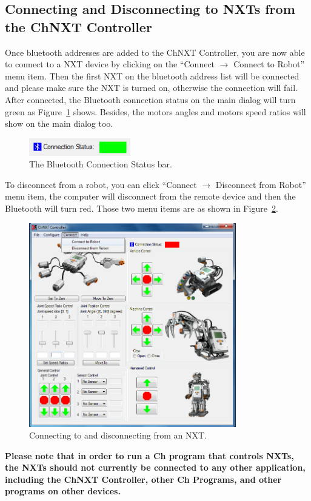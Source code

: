\documentclass[11pt]{article}
\begin{document}
\subsection{Connecting and Disconnecting to NXTs from the ChNXT Controller}
Once bluetooth addresses are added to the ChNXT Controller, you are now able to 
connect to a NXT device by clicking on the ``Connect $\rightarrow$ Connect to Robot'' 
menu item. Then the first NXT on the bluetooth address list will be connected 
and please make sure the NXT is turned on, otherwise the connection will fail. 
After connected, the Bluetooth connection status on the main dialog will turn
green as Figure~\ref{fig:bt_connection_status} shows. Besides, the motors angles
and motors speed ratios will show on the main dialog too.
\begin{figure}[H]
  \begin{center}
    \includegraphics[height=0.3in]{figure/configuration/btConnectionStatus.png}
    \caption{The Bluetooth Connection Status bar.\label{fig:bt_connection_status}}
  \end{center}
\end{figure}
To disconnect from a robot, you can click ``Connect $\rightarrow$ Disconnect 
from Robot'' menu item, the computer will disconnect from the remote device 
and then the Bluetooth will turn red. Those two menu items are as shown in 
Figure~\ref{fig:menu_connect}.\\
\begin{figure}[H]
  \begin{center}
    \includegraphics[height=3.5in]{figure/configuration/menuConnect.png}
    \caption{Connecting to and disconnecting from an NXT.\label{fig:menu_connect}}
  \end{center}
\end{figure}
{\bf Please note that in order to run a Ch program that controls NXTs, the NXTs 
should not currently be connected to any other application, including the ChNXT 
Controller, other Ch Programs, and other programs on other devices.}\\
\end{document}

